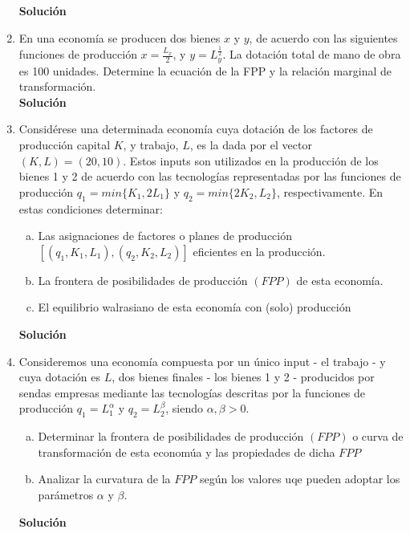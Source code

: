 \documentclass[10pt,a4paper]{article}
\begin{document}
\begin{enumerate}
\begin{itemize}
			\end{itemize}
		\textbf{\LARGE Solución}\\
			
	\item En una economía se producen dos bienes $x$ y $y$, de acuerdo con las siguientes funciones de producción $x=\frac{L_x}{2}$, y $y=L_{y}^{\frac{1}{2}}$. La dotación total de mano de obra es 100 unidades. Determine la ecuación de la FPP y la relación marginal de transformación.\\
		\textbf{\LARGE Solución}\\
			
	\item Considérese una determinada economía cuya dotación de los factores de producción capital $K$, y trabajo, $L$, es la dada por el vector $(K, L) = (20, 10)$. Estos inputs son utilizados en la producción de los bienes 1 y 2 de acuerdo con las tecnologías representadas por las funciones de producción $q_1 = min \{K_1, 2L_1\}$ y $q_2 = min \{2K_2, L_2\}$, respectivamente. En estas condiciones determinar:
		\begin{enumerate}[a)]
			\item Las asignaciones de factores o planes de producción $\left[\left( q_1, K_1, L_1\right) , \left(q_2, K_2, L_2 \right)  \right] $ eficientes en la producción.
			\item La frontera de posibilidades de producción $(FPP)$ de esta economía.
			\item El equilibrio walrasiano de esta economía con (solo) producción
		\end{enumerate}
		\textbf{\LARGE Solución}\\
			
	\item Consideremos una economía compuesta por un único input - el trabajo - y cuya dotación es $L$, dos bienes finales - los bienes 1 y 2 - producidos por sendas empresas mediante las tecnologías descritas por la funciones de producción $q_1 = L_{1}^{\alpha}$ y $q_2 = L_{2}^{\beta}$, siendo $\alpha, \beta  > 0$.
		\begin{enumerate}[a)]
			\item Determinar la frontera de posibilidades de producción $(FPP)$ o curva de transformación de esta economúa y las propiedades de dicha $FPP$
			\item Analizar la curvatura de la $FPP$ según los valores uqe pueden adoptar los parámetros $\alpha$ y $\beta$.
		\end{enumerate}
		\textbf{\LARGE Solución}\\

\end{enumerate}
\end{document}
